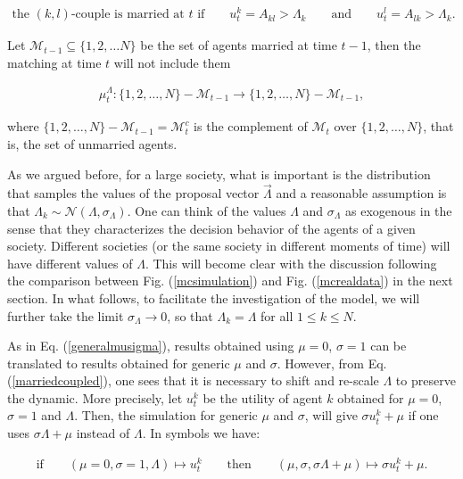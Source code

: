 \documentclass[12pt]{article}
\begin{document}
\begin{align}
    \textrm{the $(k,l)$-couple is married at $t$ if}\qquad u^k_t=A_{kl}>\Lambda_k\qquad \textrm{and}\qquad u^l_t=A_{lk}>\Lambda_k.
    \label{marriedcoupled}
\end{align}

\noindent Let $\mathcal{M}_{t-1}\subseteq\{1,2,\dots N\}$ be the set of agents married at time $t-1$, then the matching at time $t$ will not include them

\begin{align}
    \mu_t^\Lambda:\{1,2,\dots,N\}-\mathcal{M}_{t-1}\rightarrow\{1,2,\dots,N\}-\mathcal{M}_{t-1},
    \label{marriedcouples}
\end{align}

\noindent where $\{1,2,\dots,N\}-\mathcal{M}_{t-1}=\mathcal{M}^c_t$ is the complement of $\mathcal{M}_t$ over $\{1,2,\dots,N\}$, that is, the set of unmarried agents. 

As we argued before, for a large society, what is important is the distribution that samples the values of the proposal vector $\vec{\Lambda}$ and a reasonable assumption is that $\Lambda_k\sim\mathcal{N}(\Lambda,\sigma_\Lambda)$. One can think of the values $\Lambda$ and $\sigma_\Lambda$ as exogenous in the sense that they characterizes the decision behavior of the agents of a given society. Different societies (or the same society in different moments of time) will have different values of $\Lambda$. This will become clear with the discussion following the comparison between Fig. (\ref{mcsimulation}) and Fig. (\ref{mcrealdata}) in the next section. In what follows, to facilitate the investigation of the model, we will further take the limit $\sigma_\Lambda\rightarrow0$, so that $\Lambda_k=\Lambda$ for all $1\leq k\leq N$.

As in Eq. (\ref{generalmusigma}), results obtained using $\mu=0$, $\sigma=1$ can be translated to results obtained for generic $\mu$ and $\sigma$. However, from Eq. (\ref{marriedcoupled}), one sees that it is necessary to shift and re-scale $\Lambda$ to preserve the dynamic. More precisely, let $u_t^k$ be the utility of agent $k$ obtained for $\mu=0$, $\sigma=1$ and $\Lambda$. Then, the simulation for generic $\mu$ and $\sigma$, will give $\sigma u_t^k+\mu$ if one uses $\sigma\Lambda+\mu$ instead of $\Lambda$. In symbols we have:

\begin{align}
    \textrm{if}\qquad (\mu=0,\sigma=1,\Lambda)\mapsto u_t^k\qquad\textrm{then}\qquad (\mu,\sigma,\sigma\Lambda+\mu)\mapsto \sigma u_t^k+\mu.
    \label{dictionarymarried}
\end{align}
\end{document}
